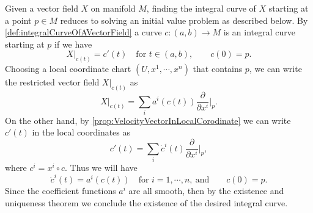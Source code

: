 \begin{summary}
	Given a vector field $ X $ on manifold $ M $, finding the integral curve of $ X $ starting at a point $ p \in M $ reduces to solving an initial value problem as described below. By \autoref{def:integralCurveOfAVectorField} a curve $ c:(a,b) \to M $ is an integral curve starting at $ p $ if we have
	\[ X|_{c(t)} = c'(t) \quad \text{for } t\in (a,b),\qquad c(0) = p.   \]
	Choosing a local coordinate chart $ (U,x^1,\cdots,x^n) $ that contains $ p $, we can write the restricted vector field $ X|_{c(t)} $ as
	\[ X|_{c(t)} = \sum_i a^i(c(t)) \frac{\partial}{\partial x^i}\big|_{p}.  \]
	On the other hand, by \autoref{prop:VelocityVectorInLocalCorodinate} we can write $ c'(t) $ in the local coordinates as
	\[ c'(t) = \sum_i \dot{c}^i(t) \frac{\partial }{\partial x^i}\big|_{p},    \]
	where $ c^i = x^i \circ c $.
	Thus we will have
	\[ \dot{c}^i(t) = a^i(c(t)) \quad \text{for } i=1,\cdots,n,\ \text{and} \qquad c(0) = p.\]
	Since the coefficient functions $ a^i $ are all smooth, then by the existence and uniqueness theorem we conclude the existence of the desired integral curve. 
\end{summary}



